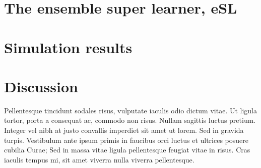 \documentclass[11pt, a4paper]{article}
\theoremstyle{definition}
\theoremstyle{remark}
\begin{document}
\section{The ensemble super learner, eSL}
\section{Simulation results}
\section{Discussion}
Pellentesque tincidunt sodales risus, vulputate iaculis odio dictum vitae. Ut ligula tortor, porta a consequat ac, commodo non risus. Nullam sagittis luctus pretium. Integer vel nibh at justo convallis imperdiet sit amet ut lorem. Sed in gravida turpis. Vestibulum ante ipsum primis in faucibus orci luctus et ultrices posuere cubilia Curae; Sed in massa vitae ligula pellentesque feugiat vitae in risus. Cras iaculis tempus mi, sit amet viverra nulla viverra pellentesque.

\printbibliography
\end{document}
